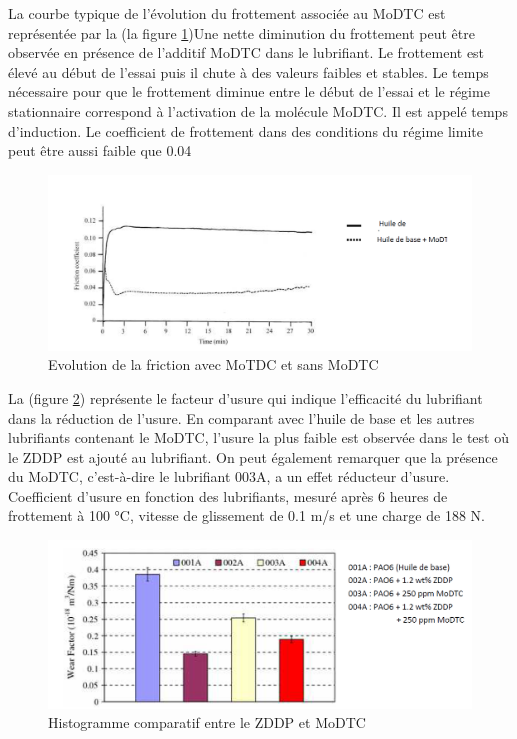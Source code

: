 La courbe typique de l'évolution du frottement associée au MoDTC est représentée par la (la figure \ref{fig:modtc-et-friction})Une nette diminution du frottement peut être observée en présence de l'additif MoDTC dans le lubrifiant. Le frottement est élevé au début de l'essai puis il chute à des valeurs faibles et stables. Le temps nécessaire pour que le frottement diminue entre le début de l'essai et le régime stationnaire
correspond à l'activation de la molécule MoDTC. Il est appelé temps d'induction. Le coefficient de frottement dans des conditions du régime limite peut être aussi faible que 0.04\cite{Amal}
\begin{figure}[h]
	\centering
	\includegraphics[width=0.7\linewidth]{"Img/MoDTC et friction"}
	\caption[]{Evolution de la friction avec MoTDC et sans MoDTC}
	\label{fig:modtc-et-friction}
\end{figure}

La (figure \ref{fig:zddp-evolution}) représente le facteur d'usure qui indique l'efficacité du lubrifiant dans la réduction de l'usure. En comparant avec l'huile de base et les autres lubrifiants contenant le MoDTC, l'usure
la plus faible est observée dans le test où le ZDDP est ajouté au lubrifiant. On peut également remarquer que la présence du MoDTC, c'est-à-dire le lubrifiant 003A, a un effet réducteur d'usure. Coefficient d'usure en fonction des lubrifiants, mesuré après 6 heures de frottement à 100 °C, vitesse de glissement de 0.1 m/s et une charge de 188 N.
\begin{figure}[h]
	\centering
	\includegraphics[width=0.7\linewidth]{"Img/Zddp evolution"}
	\caption[]{Histogramme comparatif entre le ZDDP et MoDTC}
	\label{fig:zddp-evolution}
\end{figure}

